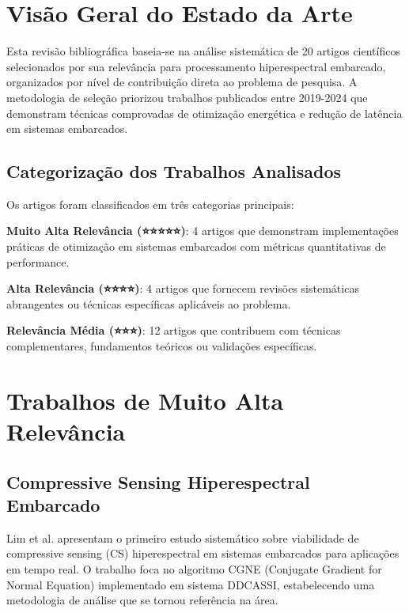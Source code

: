 
\section{Visão Geral do Estado da Arte}

Esta revisão bibliográfica baseia-se na análise sistemática de 20 artigos científicos selecionados por sua relevância para processamento hiperespectral embarcado, organizados por nível de contribuição direta ao problema de pesquisa. A metodologia de seleção priorizou trabalhos publicados entre 2019-2024 que demonstram técnicas comprovadas de otimização energética e redução de latência em sistemas embarcados.

\subsection{Categorização dos Trabalhos Analisados}

Os artigos foram classificados em três categorias principais:

\textbf{Muito Alta Relevância (⭐⭐⭐⭐⭐)}: 4 artigos que demonstram implementações práticas de otimização em sistemas embarcados com métricas quantitativas de performance.

\textbf{Alta Relevância (⭐⭐⭐⭐)}: 4 artigos que fornecem revisões sistemáticas abrangentes ou técnicas específicas aplicáveis ao problema.

\textbf{Relevância Média (⭐⭐⭐)}: 12 artigos que contribuem com técnicas complementares, fundamentos teóricos ou validações específicas.

\section{Trabalhos de Muito Alta Relevância}

\subsection{Compressive Sensing Hiperespectral Embarcado}

Lim et al. \cite{lim2022} apresentam o primeiro estudo sistemático sobre viabilidade de compressive sensing (CS) hiperespectral em sistemas embarcados para aplicações em tempo real. O trabalho foca no algoritmo CGNE (Conjugate Gradient for Normal Equation) implementado em sistema DDCASSI, estabelecendo uma metodologia de análise que se tornou referência na área.

